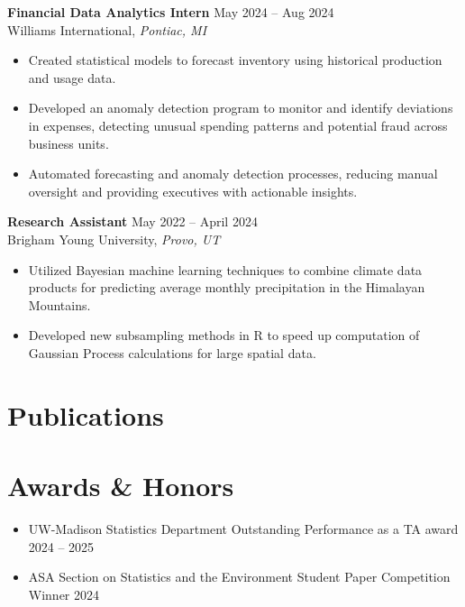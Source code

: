 \documentclass[11pt, letterpaper]{article}
\begin{document}
\vspace{6pt}
\textbf{Financial Data Analytics Intern} \hfill May 2024 -- Aug 2024 \\
\tab Williams International, \textit{Pontiac, MI}
\begin{itemize}
    \item Created statistical models to forecast inventory using historical production and usage data.
    \item Developed an anomaly detection program to monitor and identify deviations in expenses, detecting unusual spending patterns and potential fraud across business units.
    \item Automated forecasting and anomaly detection processes, reducing manual oversight and providing executives with actionable insights.
\end{itemize}

\vspace{6pt}
\textbf{Research Assistant} \hfill May 2022 -- April 2024 \\
\tab Brigham Young University, \textit{Provo, UT}
\begin{itemize}
    \item Utilized Bayesian machine learning techniques to combine climate data products for predicting average monthly precipitation in the Himalayan Mountains.
    \item Developed new subsampling methods in R to speed up computation of Gaussian Process calculations for large spatial data.
\end{itemize}


\section{Publications}
\nocite{*} 
\printbibliography[heading=none] 


\section{Awards \& Honors}
\begin{itemize}
    \item UW-Madison Statistics Department Outstanding Performance as a TA award \hfill 2024 -- 2025
    \item ASA Section on Statistics and the Environment Student Paper Competition Winner \hfill 2024
\end{itemize}
\end{document}
